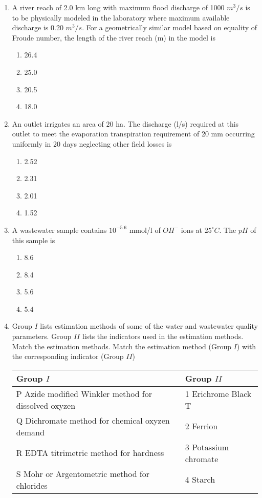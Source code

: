 \documentclass[journal]{IEEEtran}
\begin{document}
\begin{enumerate}
	\item A river reach of 2.0 km long with maximum flood discharge of 1000 $m^3/s$ is to be physically modeled in the laboratory where maximum available discharge is 0.20 $m^3/s$. For 
a geometrically similar model based on equality of Froude number, the length of the river reach (m) in the model is
\begin{multicols}{2}
	\begin{enumerate}
		\item 26.4
		\item 25.0
		\item 20.5
		\item 18.0
	\end{enumerate}
\end{multicols}
	\item An outlet irrigates an area of $20$ ha. The discharge (l/s) required at this outlet to meet the evaporation transpiration requirement of 20 mm occurring uniformly in 20 days neglecting other field losses is
		\begin{multicols}{2}
	\begin{enumerate}
		\item 2.52
		\item 2.31
		\item 2.01
		\item 1.52
	\end{enumerate}
\end{multicols}
	\item A wastewater sample contains $10^{-5.6}$ mmol/l of $OH^{-}$ ions at $25 ^{\circ}C$. The $pH$ of this sample is
		\begin{multicols}{2}
	\begin{enumerate}
		\item 8.6
		\item 8.4
		\item 5.6
		\item 5.4
	\end{enumerate}
\end{multicols}
	\item Group $I$ lists estimation methods of some of the water and wastewater quality parameters. Group $II$ lists the indicators used in the estimation methods. Match the estimation
		methods. Match the estimation method (Group $I$) with the corresponding indicator (Group $II$)\\
\begin{tabular}{ |l| l|}
\hline
Group $I$ &  Group $II$ \\ 
\hline
P Azide modified Winkler method for dissolved oxyzen & 1 Erichrome Black T \\
\hline
Q Dichromate method for chemical oxyzen demand & 2 Ferrion \\
\hline
R EDTA titrimetric method for hardness & 3 Potassium chromate  \\
\hline
S Mohr or Argentometric method for chlorides &  4 Starch \\
\hline



\end{tabular}
\end{enumerate}
\end{document}
